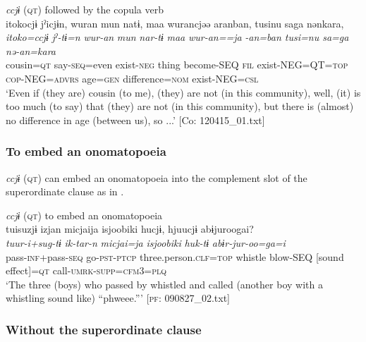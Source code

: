   \ex \textit{ccjɨ} (\textsc{qt}) followed by the copula verb\\
      \glll    {\textbar}itoko{\textbar}cjɨ  jˀicjɨn,  wuran  mun  natɨ,  {\textbar}maa{\textbar}   wurancjəə  aranban,  tusinu  {\textbar}sa{\textbar}ga  nənkara,\\
    \textit{itoko=ccjɨ}  \textit{jˀ-tɨ=n}  \textit{wur-an}  \textit{mun}  \textit{nar-tɨ}  \textit{maa} \textit{wur-an==ja}  \textit{-an=ban  tusi=nu  sa=ga  nə-an=kara}\\
    cousin=\textsc{qt}  say-\textsc{seq}=even  exist-\textsc{neg}  thing  become-SEQ  \textsc{fil} exist-NEG=QT=\textsc{top}  \textsc{cop}-NEG=\textsc{advrs}  age=\textsc{gen}  difference=\textsc{nom}  exist-NEG=\textsc{csl}\\
\glt     ‘Even if (they are) cousin (to me), (they) are not (in this community), well, (it) is too much (to say) that (they) are not (in this community), but there is (almost) no difference in age (between us), so ...’  [Co: 120415\_01.txt]
\z
\z

\subsubsection{To embed an onomatopoeia}\label{sec:10.4.1.6}

\textit{ccjɨ} (\textsc{qt}) can embed an onomatopoeia into the complement slot of the superordinate clause as in .

\ea\label{ex:10.73}   \textit{ccjɨ} (\textsc{qt}) to embed an onomatopoeia\\
      \glll    tuisuzjɨ  izjan  micjaija  isjoobiki  hucjɨ,  hjuucjɨ  abɨjuroogai?\\
    \textit{tuur-i+sug-tɨ}  \textit{ik-tar-n}  \textit{micjai=ja}  \textit{isjoobiki}  \textit{huk-tɨ}  \textit{}  \textit{abɨr-jur-oo=ga=i}\\
    pass-\textsc{inf}+pass-\textsc{seq}  go-\textsc{pst}-\textsc{ptcp}  three.person.\textsc{clf}=\textsc{top}  whistle  blow-SEQ  [sound effect]=\textsc{qt}  call-\textsc{umrk}-\textsc{supp}=\textsc{cfm}3=\textsc{plq}\\
    \glt     ‘The three (boys) who passed by whistled and called (another boy with a whistling sound like) “phweee.”’ [\textsc{pf}: 090827\_02.txt]
    \z

\subsubsection{Without the superordinate clause}\label{sec:10.4.1.7}

